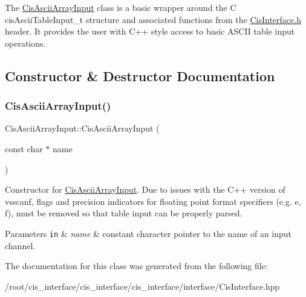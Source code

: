 The \mbox{\hyperlink{classCisAsciiArrayInput}{Cis\+Ascii\+Array\+Input}} class is a basic wrapper around the C cis\+Ascii\+Table\+Input\+\_\+t structure and associated functions from the \mbox{\hyperlink{CisInterface_8h_source}{Cis\+Interface.\+h}} header. It provides the user with C++ style access to basic A\+S\+C\+II table input operations. 

\subsection{Constructor \& Destructor Documentation}
\mbox{\label{classCisAsciiArrayInput_a5b93411bc0df794c6f6a3189d2e02289}} 
\subsubsection{\texorpdfstring{Cis\+Ascii\+Array\+Input()}{CisAsciiArrayInput()}}
{\footnotesize\ttfamily Cis\+Ascii\+Array\+Input\+::\+Cis\+Ascii\+Array\+Input (\begin{DoxyParamCaption}\item[{const char $\ast$}]{name }\end{DoxyParamCaption})\hspace{0.3cm}{\ttfamily [inline]}}



Constructor for \mbox{\hyperlink{classCisAsciiArrayInput}{Cis\+Ascii\+Array\+Input}}. Due to issues with the C++ version of vsscanf, flags and precision indicators for floating point format specifiers (e.\+g. e, f), must be removed so that table input can be properly parsed. 


\begin{DoxyParams}[1]{Parameters}
\mbox{\tt in}  & {\em name} & constant character pointer to the name of an input channel. \\
\hline
\end{DoxyParams}


The documentation for this class was generated from the following file\+:\begin{DoxyCompactItemize}
\item 
/root/cis\+\_\+interface/cis\+\_\+interface/cis\+\_\+interface/interface/Cis\+Interface.\+hpp\end{DoxyCompactItemize}
